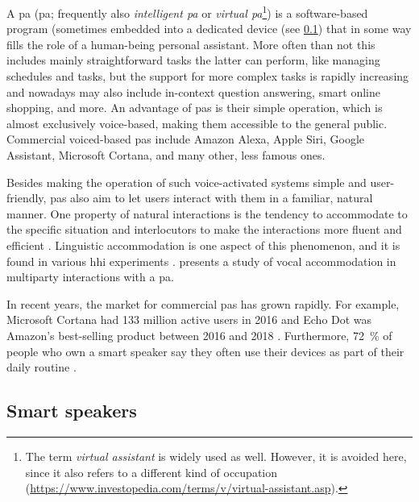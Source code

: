 A \acl{pa} (\acs{pa}; frequently also \emph{intelligent \acl{pa}} or \emph{virtual \acl{pa}}\footnote{The term \emph{virtual assistant} is widely used as well. However, it is avoided here, since it also refers to a different kind of occupation (\url{https://www.investopedia.com/terms/v/virtual-assistant.asp}).}) is a software-based program (sometimes embedded into a dedicated device (see \cref{subsec:smart_speakers}) that in some way fills the role of a human-being personal assistant.
More often than not this includes mainly straightforward tasks the latter can perform, like managing schedules and tasks, but the support for more complex tasks is rapidly increasing and nowadays may also include in-context question answering, smart online shopping, and more.
An advantage of \acp{pa} is their simple operation, which is almost exclusively voice-based, making them accessible to the general public.
Commercial voiced-based \acp{pa} include Amazon Alexa, Apple Siri, Google Assistant, Microsoft Cortana, and many other, less famous ones.

Besides making the operation of such voice-activated systems simple and user-friendly, \acp{pa} also aim to let users interact with them in a familiar, natural manner.
One property of natural interactions is the tendency to accommodate to the specific situation and interlocutors to make the interactions more fluent and efficient \citep{Gallois2015CAT}.
Linguistic accommodation is one aspect of this phenomenon, and it is found in various \ac{hhi} experiments \citep[e.g.,][]{Pardo2017phonetic,Schweitzer2017social}.
 presents a study of vocal accommodation in multiparty interactions with a \ac{pa}.

In recent years, the market for commercial \acp{pa} has grown rapidly.
For example, Microsoft Cortana had 133 million active users in 2016 \citep{Osborne2016why} and Echo Dot was Amazon's best-selling product between 2016 and 2018 \citep{Dickey2017echo}.
Furthermore, \SI{72}{\percent} of people who own a smart speaker say they often use their devices as part of their daily routine \citep{Kleinberg2018ways}.

\subsection{Smart speakers}
\label{subsec:smart_speakers}

